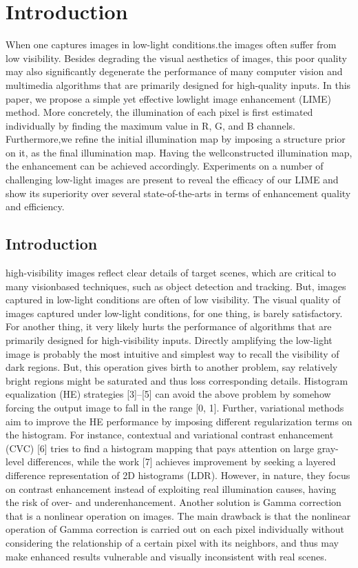 \chapter{Introduction}
When one captures images in low-light conditions.the images often suffer from low visibility. Besides degrading the visual aesthetics of images, this poor quality may also significantly degenerate the performance of many computer vision and multimedia algorithms that are primarily designed for high-quality inputs. In this paper, we propose a simple yet effective lowlight image enhancement (LIME) method. More concretely, the illumination of each pixel is first estimated individually by finding
the maximum value in R, G, and B channels. Furthermore,we refine the initial illumination map by imposing a structure prior on it, as the final illumination map. Having the wellconstructed illumination map, the enhancement can be achieved accordingly. Experiments on a number of challenging low-light
images are present to reveal the efficacy of our LIME and show its superiority over several state-of-the-arts in terms of enhancement quality and efficiency.
\section{Introduction}
 high-visibility images reflect clear details of target scenes, which are critical to many visionbased techniques, such as object detection and tracking. But, images captured in low-light conditions are often of low visibility. The visual quality of images captured under low-light conditions, for one thing, is barely satisfactory. For another thing, it very likely hurts the performance of algorithms that are primarily designed for high-visibility inputs. Directly amplifying the low-light image is probably the most intuitive and simplest way to recall the visibility of dark regions. But, this operation gives birth to another problem, say relatively bright regions might be saturated and thus loss corresponding details. Histogram equalization (HE) strategies [3]–[5] can avoid the above problem by somehow forcing the output image to fall in the range [0, 1]. Further, variational methods aim to improve the HE performance by imposing different regularization terms on the histogram. For instance, contextual and variational contrast enhancement (CVC) [6] tries to find a histogram mapping that pays
attention on large gray-level differences, while the work [7] achieves improvement by seeking a layered difference representation of 2D histograms (LDR). However, in nature, they focus on contrast enhancement instead of exploiting real illumination causes, having the risk of over- and underenhancement. Another solution is Gamma correction that is a nonlinear operation on images. The main drawback is that the nonlinear operation of Gamma correction is carried out on each pixel individually without considering the relationship of a certain pixel with its neighbors, and thus may make enhanced results vulnerable and visually inconsistent with real scenes.

